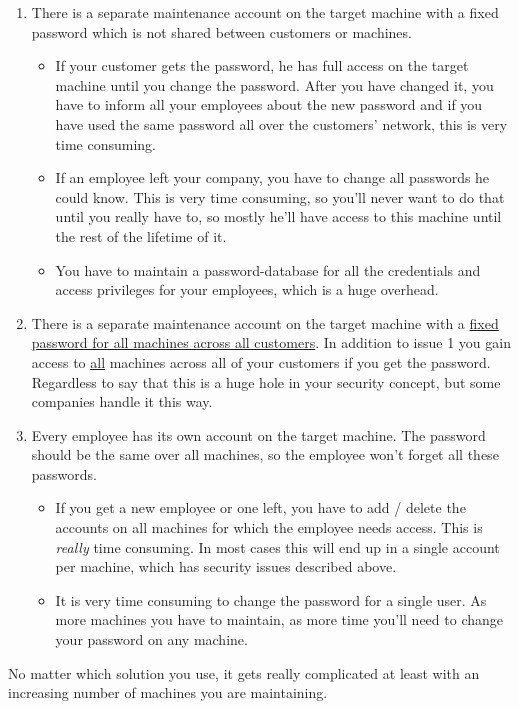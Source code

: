 \begin{enumerate}
	\item There is a separate maintenance account on the target machine with a
		fixed password which is not shared between customers or machines.
		\begin{itemize}
			\item If your customer gets the password, he has full access on the
				target machine until you change the password. After you have
				changed it, you have to inform all your employees about the new
				password and if you have used the same password all over the
				customers' network, this is very time consuming.
			\item If an employee left your company, you have to change all
				passwords he could know. This is very time consuming, so you'll
				never want to do that until you really have to, so mostly he'll
				have access to this machine until the rest of the lifetime of
				it.
			\item You have to maintain a password-database for all the
				credentials and access privileges for your employees, which is a
				huge overhead.
		\end{itemize}

	\item There is a separate maintenance account on the target machine with a
		\ul{fixed password for all machines across all customers}. In addition
		to issue 1 you gain access to \ul{all} machines across all of your
		customers if you get the password. Regardless to say that this is a huge
		hole in your security concept, but some companies handle it this way.

	\item Every employee has its own account on the target machine. The
		password should be the same over all machines, so the employee won't
		forget all these passwords.
		\begin{itemize}
			\item If you get a new employee or one left, you have to add /
				delete the accounts on all machines for which the employee needs
				access. This is \textit{really} time consuming. In most cases
				this will end up in a single account per machine, which has
				security issues described above.
			\item It is very time consuming to change the password for a single
				user. As more machines you have to maintain, as more time you'll
				need to change your password on any machine.
		\end{itemize}
\end{enumerate}

No matter which solution you use, it gets really complicated at least with an
increasing number of machines you are maintaining.
